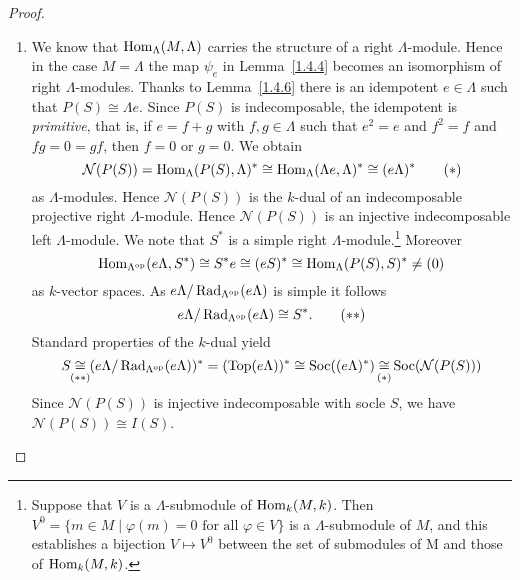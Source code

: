 \begin{proof}\
\begin{enumerate}
\item We know that $\operatorname{Hom}_\Lambda(M,\Lambda)$ carries the structure of a right $\Lambda$-module. Hence in the case $M=\Lambda$ the map $\psi_e$ in Lemma~\ref{1.4.4} becomes an isomorphism of right $\Lambda$-modules. Thanks to Lemma~\ref{1.4.6} there is an idempotent $e\in\Lambda$ such that $P(S)\cong \Lambda e$. Since $P(S)$ is indecomposable, the idempotent is \textit{primitive}, that is, if $e=f+g$ with $f,g\in\Lambda$ such that $e^2=e$ and $f^2=f$ and $fg=0=gf$, then $f=0$ or $g=0$. We obtain
\[
\mathcal N(P(S)) = \operatorname{Hom}_\Lambda(P(S),\Lambda)^* \cong \operatorname{Hom}_\Lambda(\Lambda e,\Lambda)^* \cong (e\Lambda)^*
\tag{$*$}
\]
as $\Lambda$-modules. Hence $\mathcal N (P(S))$ is the $k$-dual of an indecomposable projective right $\Lambda$-module. Hence $\mathcal N (P(S))$ is an injective indecomposable left $\Lambda$-module. We note that $S^*$ is a simple right $\Lambda$-module.\footnote{Suppose that $V$ is a $\Lambda$-submodule of $\operatorname{Hom}_k(M,k)$. Then $V^0=\{m\in M\mid \varphi (m)=0 \text{ for all } \varphi\in V \}$ is a $\Lambda$-submodule of $M$, and this establishes a bijection $V\mapsto V^0$ between the set of submodules of M and those of $\operatorname{Hom}_k(M,k)$.} Moreover
\[
\operatorname{Hom}_{\Lambda^{\mathrm{op}}}(e\Lambda,S^*) \cong S^* e \cong (eS)^* \cong \operatorname{Hom}_\Lambda(P(S),S)^* \neq (0)
\]
as $k$-vector spaces. As $e\Lambda/\operatorname{Rad}_{\Lambda^{\mathrm{op}}}(e\Lambda)$ is simple it follows
\[
e\Lambda/\operatorname{Rad}_{\Lambda^{\mathrm{op}}}(e\Lambda) \cong S^*.\tag{$**$}
\]
Standard properties of the $k$-dual yield
\[
S \underset{\mathclap{(**)}} \cong (e\Lambda/\Rad_{\Lambda^\op}(e\Lambda))^*
  = (\Top(e\Lambda))^*
  \cong \Soc((e\Lambda)^*)
  \underset{\mathclap{(*)}} \cong \Soc(\mathcal N(P(S))) 
\]
Since $\mathcal N(P(S))$ is injective indecomposable with socle $S$, we have $\mathcal N(P(S))\cong I(S)$.


\end{enumerate}
\end{proof}
